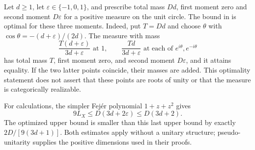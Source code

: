 \begin{remark}
Let $d\geq1$, let $\varepsilon\in\{-1,0,1\}$, and prescribe total mass
$Dd$, first moment zero and second moment $D\varepsilon$ for a positive
measure on the unit circle. The bound in
\cite[Proposition~\ref{B-prop:optimized-moment}]{Finite} is optimal for
these three moments. Indeed,
put $T=Dd$ and choose $\theta$ with
$\cos\theta=-(d+\varepsilon)/(2d)$. The measure with mass
\[
 \frac{T(d+\varepsilon)}{3d+\varepsilon}\text{ at }1,
 \qquad
 \frac{Td}{3d+\varepsilon}\text{ at each of }e^{i\theta},e^{-i\theta}
\]
has total mass $T$, first moment zero, and second moment $D\varepsilon$,
and it attains equality. If the two latter points coincide, their masses
are added. This optimality statement does not assert that these points are
roots of unity or that the measure is categorically realizable.

For calculations, the simpler Fej\'er polynomial $1+z+z^2$ gives
\[
 9L_X\leq D(3d+2\varepsilon)\leq D(3d+2).
\]
The optimized upper bound is smaller than this last upper bound by exactly
$2D/[9(3d+1)]$. Both estimates apply without a unitary structure;
pseudo-unitarity supplies the positive dimensions used in their proofs.
\end{remark}
